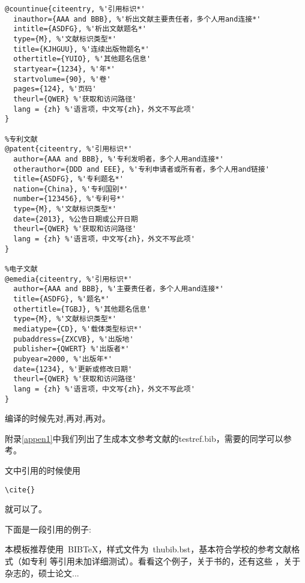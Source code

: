 \begin{lstlisting}[escapeinside='',frame=single]
%连续出版物中的析出文献
@countinue{citeentry, %'引用标识*'
  inauthor={AAA and BBB}, %'析出文献主要责任者，多个人用and连接*'
  intitle={ASDFG}, %'析出文献题名*'
  type={M}, %'文献标识类型*'
  title={KJHGUU}, %'连续出版物题名*'
  othertitle={YUIO}, %'其他题名信息'
  startyear={1234}, %'年*'
  startvolume={90}, %'卷'
  pages={124}, %'页码'
  theurl={QWER} %'获取和访问路径'
  lang = {zh} %'语言项，中文写{zh}，外文不写此项'
}

%专利文献
@patent{citeentry, %'引用标识*'
  author={AAA and BBB}, %'专利发明者，多个人用and连接*'
  otherauthor={DDD and EEE}, %'专利申请者或所有者，多个人用and链接'
  title={ASDFG}, %'专利题名*'
  nation={China}, %'专利国别*'
  number={123456}, %'专利号*'
  type={M}, %'文献标识类型*'
  date={2013}, %公告日期或公开日期
  theurl={QWER} %'获取和访问路径'
  lang = {zh} %'语言项，中文写{zh}，外文不写此项'
}

%电子文献
@emedia{citeentry, %'引用标识*'
  author={AAA and BBB}, %'主要责任者，多个人用and连接*'
  title={ASDFG}, %'题名*'
  othertitle={TGBJ}, %'其他题名信息'
  type={M}, %'文献标识类型*'
  mediatype={CD}, %'载体类型标识*'
  pubaddress={ZXCVB}, %'出版地'
  publisher={QWERT} %'出版者*'
  pubyear=2000, %'出版年*'
  date={1234}, %'更新或修改日期'
  theurl={QWER} %'获取和访问路径'
  lang = {zh} %'语言项，中文写{zh}，外文不写此项'
}

\end{lstlisting}
编译的时候先对,再对,再对。\par
附录\ref{appen1}中我们列出了生成本文参考文献的testref.bib，需要的同学可以参考。\par
文中引用的时候使用
\begin{lstlisting}[frame=single]
\cite{}
\end{lstlisting}
就可以了。\par
下面是一段引用的例子:\par
本模板推荐使用~BIB\TeX，样式文件为~thubib.bst，基本符合学校的参考文献格式（如专利
等引用未加详细测试）。看看这个例子，关于书的\cite{tex, companion, IEEE-1363}，还有这些 \cite{Krasnogor2004e, clzs, zjsw}，关于杂志的\cite{ELIDRISSI94,  MELLINGER96}，硕士论文...\par